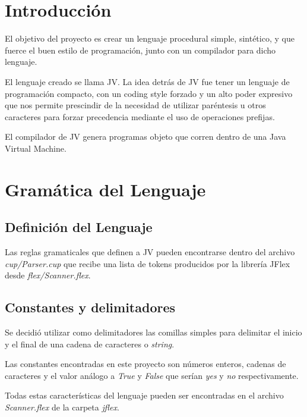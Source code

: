 \documentclass{article}
\begin{document}

\clearpage
\tableofcontents

\clearpage

\section{Introducción}
\par El objetivo del proyecto es crear un lenguaje procedural simple, sintético, y que fuerce el buen estilo de programación, junto con un compilador para dicho lenguaje.\\
\par El lenguaje creado se llama JV. La idea detrás de JV fue tener un lenguaje de programación compacto, con un coding style forzado y un alto poder expresivo que nos permite prescindir de la necesidad de utilizar paréntesis u otros caracteres para forzar precedencia mediante el uso de operaciones prefijas.
\par El compilador de JV genera  programas objeto que corren dentro de una Java Virtual Machine.
\clearpage


\section{Gramática del Lenguaje}

\subsection{Definición del Lenguaje}
\par Las reglas gramaticales que definen a JV pueden encontrarse dentro del archivo \textit{cup/Parser.cup} que recibe una lista de tokens producidos por la librería JFlex desde \textit{flex/Scanner.flex}.
\subsection{Constantes y delimitadores}
\par Se decidió utilizar como delimitadores las comillas simples para delimitar el inicio y el final de una cadena de caracteres o \textit{string}.
\par Las constantes encontradas en este proyecto son números enteros, cadenas de caracteres y el valor análogo a \textit{True} y \textit{False} que serían \textit{yes} y \textit{no} respectivamente.
\par Todas estas características del lenguaje pueden ser encontradas en el archivo \textit{Scanner.flex} de la carpeta \textit{jflex}. 
\end{document}
